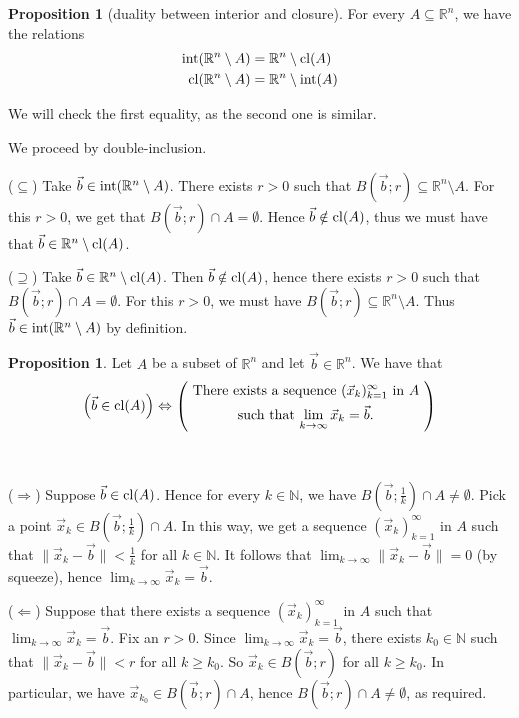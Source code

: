 \documentclass[11pt]{article}
\makeatletter
\theoremstyle{definition}
\newtheorem{prop}[thm]{Proposition}
\newcommand{\N}{\ensuremath{\mathbb{N}}}
\newcommand{\R}{\ensuremath{\mathbb{R}}}
\newenvironment{pf}[1][\proofname]{\par
  \pushQED{\qed}%
  \normalfont \topsep0\p@\relax
  \trivlist
  \item[\hskip\labelsep\itshape
  #1\@addpunct{.}]\ignorespaces
}{%
  \popQED\endtrivlist\@endpefalse
}
\makeatother
\begin{document}
\begin{prop}[duality between interior and closure]
For every $A \subseteq \R^n$, we have the relations
\begin{align*}
    {\rm int}(\R^n \setminus A) &= \R^n \setminus {\rm cl}(A) \\
    {\rm cl}(\R^n \setminus A) &= \R^n \setminus {\rm int}(A)
\end{align*}
\end{prop}
\begin{pf}
We will check the first equality, as the second one is similar.

We proceed by double-inclusion.

($\subseteq$) Take $\vec{b} \in {\rm int}(\R^n \setminus A)$. There exists $r > 0$ such that $B(\vec{b}; r) \subseteq \R^n \setminus A$. For this $r > 0$, we get that $B(\vec{b}; r) \cap A = \emptyset$. Hence $\vec{b} \notin {\rm cl}(A)$, thus we must have that $\vec{b} \in \R^n \setminus {\rm cl}(A)$. 

($\supseteq$) Take $\vec{b} \in \R^n \setminus {\rm cl}(A)$. Then $\vec{b} \notin {\rm cl}(A)$, hence there exists $r > 0$ such that $B(\vec{b}; r) \cap A = \emptyset$. For this $r > 0$, we must have $B(\vec{b}; r) \subseteq \R^n \setminus A$. Thus $\vec{b} \in {\rm int}(\R^n \setminus A)$ by definition.
\end{pf}

\begin{prop}
Let $A$ be a subset of $\R^n$ and let $\vec{b} \in \R^n$. We have that
$$\left( \vec{b} \in {\rm cl}(A) \right) \Leftrightarrow \left( \begin{aligned} \text{ There } & \text{exists a sequence $(\vec{x}_k)_{k=1}^\infty$ in $A$ } \\ & \text{ such that $\lim_{k\to\infty} \vec{x}_k = \vec{b}$. } \end{aligned} \right)$$
\end{prop}
\begin{pf}~

($\Rightarrow$) Suppose $\vec{b} \in {\rm cl}(A)$. Hence for every $k \in \N$, we have $B(\vec{b}; \frac1k) \cap A \neq \emptyset$. Pick a point $\vec{x}_k \in B(\vec{b}; \frac1k) \cap A$. In this way, we get a sequence $(\vec{x}_k)_{k=1}^\infty$ in $A$ such that $\|\vec{x}_k - \vec{b}\| < \frac1k$ for all $k \in \N$. It follows that $\lim_{k\to\infty} \|\vec{x}_k - \vec{b}\| = 0$ (by squeeze), hence $\lim_{k\to\infty} \vec{x}_k = \vec{b}$. 

($\Leftarrow$) Suppose that there exists a sequence $(\vec{x}_k)_{k=1}^\infty$ in $A$ such that $\lim_{k\to\infty} \vec{x}_k = \vec{b}$. Fix an $r > 0$. Since $\lim_{k\to\infty} \vec{x}_k = \vec{b}$, there exists $k_0 \in \N$ such that $\|\vec{x}_k - \vec{b}\| < r$ for all $k \geq k_0$. So $\vec{x}_k \in B(\vec{b}; r)$ for all $k \geq k_0$. In particular, we have $\vec{x}_{k_0} \in B(\vec{b}; r) \cap A$, hence $B(\vec{b}; r) \cap A \neq \emptyset$, as required.
\end{pf}
\end{document}
